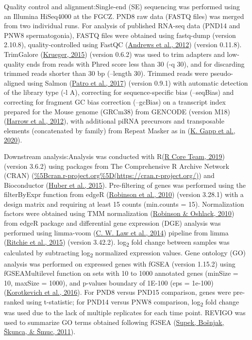 \documentclass[12pt,twoside]{reedthesis}
\begin{document}
Quality control and alignment:Single-end (SE) sequencing was performed
using an Illumina HiSeq4000 at the FGCZ. PND8 raw data (FASTQ files) was
merged from two individual runs. For analysis of published RNA-seq data
(PND14 and PNW8 spermatogonia), FASTQ files were obtained using
fastq-dump (version 2.10.8), quality-controlled using FastQC
(\protect\hyperlink{ref-andrews2012}{Andrews et al., 2012}) (version 0.11.8). TrimGalore (\protect\hyperlink{ref-krueger2015}{Krueger, 2015}) (version
0.6.2) was used to trim adapters and low-quality ends from reads with
Phred score less than 30 (-q 30), and for discarding trimmed reads
shorter than 30 bp (--length 30). Trimmed reads were pseudo-aligned
using Salmon (\protect\hyperlink{ref-patro2017}{Patro et al., 2017}) (version 0.9.1) with automatic detection of
the library type (-l A), correcting for sequence-specific bias
(--seqBias) and correcting for fragment GC bias correction (--gcBias) on
a transcript index prepared for the Mouse genome (GRCm38) from GENCODE
(version M18) (\protect\hyperlink{ref-harrow2012}{Harrow et al., 2012}), with additional piRNA precursors and
transposable elements (concatenated by family) from Repeat Masker as in
(\protect\hyperlink{ref-gapp2020}{K. Gapp et al., 2020}).

Downstream analysis:Analysis was conducted with R(\protect\hyperlink{ref-rcoreteam2019}{R Core Team, 2019})
(version 3.6.2) using packages from The Comprehensive R Archive Network
(CRAN)
(\url{\%5Bcran.r-project.org\%5D(https://cran.r-project.org/)})
and Bioconductor (\protect\hyperlink{ref-huber2015}{Huber et al., 2015}). Pre-filtering of genes was performed
using the filterByExpr function from edgeR (\protect\hyperlink{ref-robinson2010}{Robinson et al., 2010}) (version
3.28.1) with a design matrix and requiring at least 15 counts
(min.counts = 15). Normalization factors were obtained using TMM
normalization (\protect\hyperlink{ref-robinson2010a}{Robinson \& Oshlack, 2010}) from edgeR package and differential gene
expression (DGE) analysis was performed using limma-voom (\protect\hyperlink{ref-law2014}{C. W. Law et al., 2014})
pipeline from limma (\protect\hyperlink{ref-ritchie2015}{Ritchie et al., 2015}) (version 3.42.2). log\textsubscript{2} fold change
between samples was calculated by subtracting log\textsubscript{2} normalized expression
values. Gene ontology (GO) analysis was performed on expressed genes
with fGSEA (version 1.15.2) using fGSEAMultilevel function on sets with
10 to 1000 annotated genes (minSize = 10, maxSize = 1000), and p-values
boundary of 1E-100 (eps = 1e-100) (\protect\hyperlink{ref-korotkevich2016}{Korotkevich et al., 2016}). For PND8 versus
PND15 comparison, genes were pre-ranked using t-statistic; for PND14
versus PNW8 comparison, log\textsubscript{2} fold change was used due to the lack of
multiple replicates for each time point. REVIGO was used to summarize GO
terms obtained following fGSEA (\protect\hyperlink{ref-supek2011}{Supek, Bošnjak, Škunca, \& Šmuc, 2011}).
\end{document}
